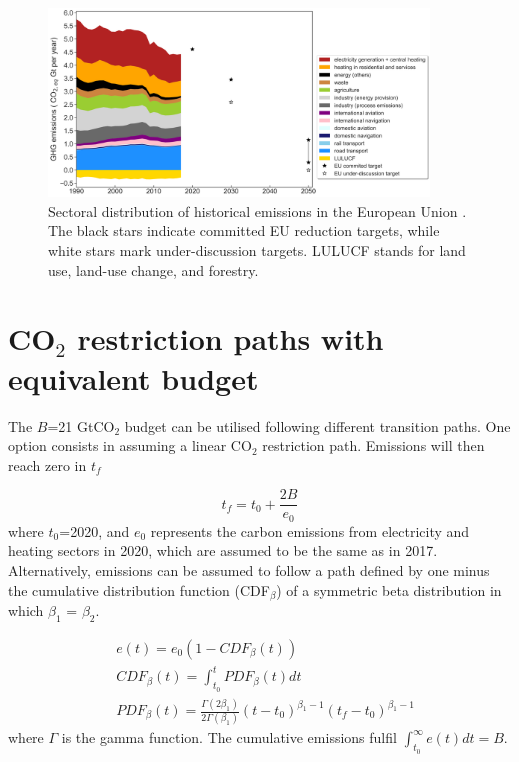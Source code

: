 \documentclass[3p]{elsarticle} %
\begin{document}
\begin{figure}[!h]
\centering
\includegraphics[width=0.9\textwidth]{figures/historical_sectoral_emissions.png}
\caption{Sectoral distribution of historical emissions in the European Union \cite{UNFCCC_inventory}. The black stars indicate committed EU reduction targets, while white stars mark under-discussion targets. LULUCF stands for land use, land-use change, and forestry.} \label{fig_historical_emissions} 
\end{figure}

\FloatBarrier

\section{CO$_2$ restriction paths with equivalent budget}

The $B$=21 GtCO$_2$ budget can be utilised following different transition paths. One option consists in assuming a linear CO$_2$ restriction path. Emissions will then reach zero in $t_f$

\begin{equation}
	t_f=t_0+\frac{2B}{e_0}
\end{equation}
where $t_0$=2020, and $e_0$ represents the carbon emissions from electricity and heating sectors in 2020, which are assumed to be the same as in 2017. \\

Alternatively, emissions can be assumed to follow a path defined by one minus the cumulative distribution function (CDF$_\beta$) of a symmetric beta distribution in which $\beta_1$ = $\beta_2$. 

\begin{equation}
\begin{aligned}
&	e (t) = e_0(1- CDF_{\beta}(t)) \\
&	CDF_{\beta} (t) =\int_{t_0}^{t} PDF_{\beta}(t) dt \\
&	PDF_{\beta} (t) =  \frac{\Gamma(2\beta_1)}{2\Gamma(\beta_1)} (t-t_0)^{\beta_1-1} (t_f-t_0)^{\beta_1-1}
\end{aligned}
\end{equation}
where $\Gamma$ is the gamma function. The cumulative emissions fulfil $\int_{t_0}^{\infty} e(t) dt =B$. \\
\end{document}
